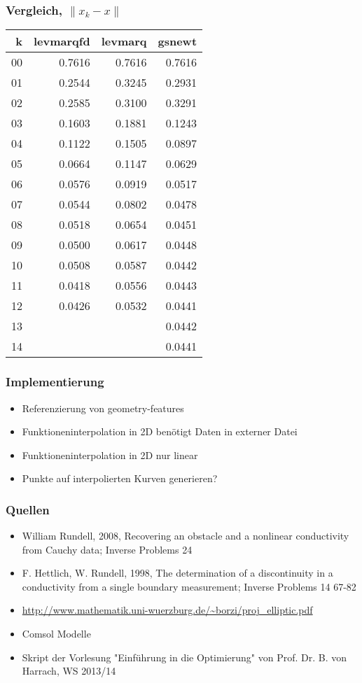 \documentclass{beamer}
\begin{document}
\begin{frame}
	\frametitle{Vergleich, $\|x_k - x\|$}
	\fontsize{8pt}{10pt}\selectfont
	\begin{table}
		\centering
	\begin{tabular}{r|rrr}
 k  &    levmarqfd & levmarq  &  gsnewt \\ \hline
00  &    0.7616    & 0.7616   &  0.7616 \\
01  &    0.2544    & 0.3245   &  0.2931 \\
02  &    0.2585    & 0.3100   &  0.3291 \\
03  &    0.1603    & 0.1881   &  0.1243 \\
04  &    0.1122    & 0.1505   &  0.0897 \\
05  &    0.0664    & 0.1147   &  0.0629 \\
06  &    0.0576    & 0.0919   &  0.0517 \\
07  &    0.0544    & 0.0802   &  0.0478 \\
08  &    0.0518    & 0.0654   &  0.0451 \\
09  &    0.0500    & 0.0617   &  0.0448 \\
10  &    0.0508    & 0.0587   &  0.0442 \\
11  &    0.0418    & 0.0556   &  0.0443 \\
12  &    0.0426    & 0.0532   &  0.0441 \\
13  &              &          &  0.0442 \\
14  &              &          &  0.0441
	\end{tabular}
	\end{table}
\end{frame}

\begin{frame}
	\frametitle{Implementierung}
	\begin{itemize}
		\item
			Referenzierung von geometry-features
		\item
			Funktioneninterpolation in 2D benötigt Daten in externer Datei
		\item
			Funktioneninterpolation in 2D nur linear
		\item
			Punkte auf interpolierten Kurven generieren?
	\end{itemize}
\end{frame}

\begin{frame}
	\frametitle{Quellen}
	\begin{itemize}
		\item
	William Rundell, 2008, Recovering an obstacle and a nonlinear conductivity from Cauchy data; Inverse Problems 24
\item
 F. Hettlich, W. Rundell, 1998, The determination of a discontinuity in a conductivity from a single boundary measurement; Inverse Problems 14 67-82
 \item
	 \url{http://www.mathematik.uni-wuerzburg.de/~borzi/proj_elliptic.pdf}
 \item
 Comsol Modelle
 \item
 Skript der Vorlesung "Einführung in die Optimierung" von Prof. Dr. B. von Harrach, WS 2013/14
	\end{itemize}
\end{frame}
\end{document}
